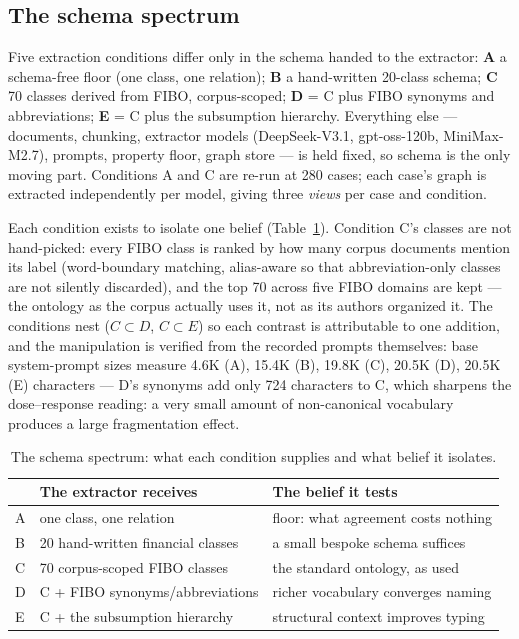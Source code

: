 \documentclass{article}
\begin{document}
\subsection{The schema spectrum}

Five extraction conditions differ only in the schema handed to the
extractor: \textbf{A} a schema-free floor (one class, one relation);
\textbf{B} a hand-written 20-class schema; \textbf{C} 70 classes derived
from FIBO, corpus-scoped; \textbf{D} = C plus FIBO synonyms and
abbreviations; \textbf{E} = C plus the subsumption hierarchy. Everything
else --- documents, chunking, extractor models (DeepSeek-V3.1, gpt-oss-120b,
MiniMax-M2.7), prompts, property floor, graph store --- is held fixed, so
schema is the only moving part. Conditions A and C are re-run at 280 cases;
each case's graph is extracted independently per model, giving three
\emph{views} per case and condition.

Each condition exists to isolate one belief (Table~\ref{tab:conditions}).
Condition C's classes are not hand-picked: every FIBO class is ranked by
how many corpus documents mention its label (word-boundary matching,
alias-aware so that abbreviation-only classes are not silently discarded),
and the top 70 across five FIBO domains are kept --- the ontology as the
corpus actually uses it, not as its authors organized it. The conditions
nest ($C \subset D$, $C \subset E$) so each contrast is attributable to one
addition, and the manipulation is verified from the recorded prompts
themselves: base system-prompt sizes measure 4.6K (A), 15.4K (B), 19.8K
(C), 20.5K (D), 20.5K (E) characters --- D's synonyms add only 724
characters to C, which sharpens the dose--response reading: a very small
amount of non-canonical vocabulary produces a large fragmentation effect.

\begin{table}[h]
\centering\small
\caption{The schema spectrum: what each condition supplies and what belief
it isolates.}
\label{tab:conditions}
\begin{tabular}{llp{6.2cm}}
\toprule
 & The extractor receives & The belief it tests \\
\midrule
A & one class, one relation & floor: what agreement costs nothing \\
B & 20 hand-written financial classes & a small bespoke schema suffices \\
C & 70 corpus-scoped FIBO classes & the standard ontology, as used \\
D & C + FIBO synonyms/abbreviations & richer vocabulary converges naming \\
E & C + the subsumption hierarchy & structural context improves typing \\
\bottomrule
\end{tabular}
\end{table}
\end{document}
